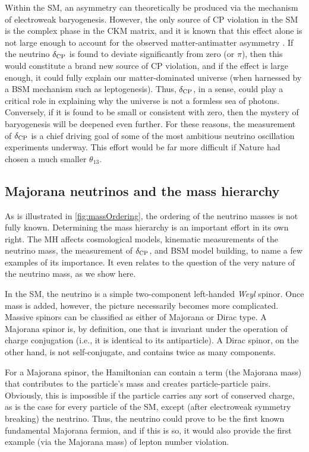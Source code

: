\documentclass[../thesis.tex]{subfiles}
\begin{document}
Within the SM, an asymmetry can theoretically be produced via the mechanism of electroweak baryogenesis. However, the only source of CP violation in the SM is the complex phase in the CKM matrix, and it is known that this effect alone is not large enough to account for the observed matter-antimatter asymmetry \cite{Shaposhnikov:2009zzc}. If the neutrino $\delta_\text{CP}$ is found to deviate significantly from zero (or $\pi$), then this would constitute a brand new source of CP violation, and if the effect is large enough, it could fully explain our matter-dominated universe (when harnessed by a BSM mechanism such as leptogenesis). Thus, $\delta_\text{CP}$, in a sense, could play a critical role in explaining why the universe is not a formless sea of photons. Conversely, if it is found to be small or consistent with zero, then the mystery of baryogenesis will be deepened even further. For these reasons, the measurement of $\delta_\text{CP}$ is a chief driving goal of some of the most ambitious neutrino oscillation experiments underway. This effort would be far more difficult if Nature had chosen a much smaller $\theta_{13}$.

\subsection{Majorana neutrinos and the mass hierarchy}
\label{sec:majorana}

As is illustrated in \autoref{fig:massOrdering}, the ordering of the neutrino masses is not fully known. Determining the mass hierarchy is an important effort in its own right. The MH affects cosmological models, kinematic measurements of the neutrino mass,
the measurement of $\delta_\text{CP}$, and BSM model building, to name a few examples of its importance. It even relates to the question of the very nature of the neutrino mass, as we show here.

In the SM, the neutrino is a simple two-component left-handed \emph{Weyl} spinor. Once mass is added, however, the picture necessarily becomes more complicated. Massive spinors can be classified as either of Majorana or Dirac type. A Majorana spinor is, by definition, one that is invariant under the operation of charge conjugation (i.e., it is identical to its antiparticle). A Dirac spinor, on the other hand, is not self-conjugate, and contains twice as many components.

For a Majorana spinor, the Hamiltonian can contain a term (the Majorana mass) that contributes to the particle's mass and creates particle-particle pairs. Obviously, this is impossible if the particle carries any sort of conserved charge, as is the case for every particle of the SM, except (after electroweak symmetry breaking) the neutrino. Thus, the neutrino could prove to be the first known fundamental Majorana fermion, and if this is so, it would also provide the first example (via the Majorana mass) of lepton number violation.
\end{document}

